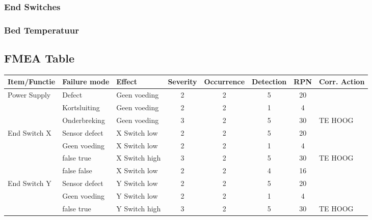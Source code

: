 \documentclass{article}
\begin{document}
\subsubsection*{End Switches}

\subsubsection*{Bed Temperatuur}

\newpage
\begin{landscape}
    \subsection{FMEA Table} 
    \begin{longtable}{|l|l|l|c|c|c|c|l|}
        \hline
        \textbf{Item/Functie} & \textbf{Failure mode} & \textbf{Effect} & \textbf{Severity} & \textbf{Occurrence} & \textbf{Detection} & \textbf{RPN} & \textbf{Corr. Action} \\ \hline
        \multirow{3}{*}{Power Supply}       & Defect            & Geen voeding  & 2 & 2 & 5 & 20 & \\
                                            & Kortsluiting      & Geen voeding  & 2 & 2 & 1 &  4 & \\
                                            & Onderbreking      & Geen voeding  & 3 & 2 & 5 & 30 & TE HOOG \\
                                            \hline
        \multirow{4}{*}{End Switch X}       & Sensor defect     & X Switch low  & 2 & 2 & 5 & 20 & \\
                                            & Geen voeding      & X Switch low  & 2 & 2 & 1 &  4 & \\
                                            & false true        & X Switch high & 3 & 2 & 5 & 30 & TE HOOG \\
                                            & false false       & X Switch low  & 2 & 2 & 4 & 16 & \\ 
                                            \hline
        \multirow{4}{*}{End Switch Y}       & Sensor defect     & Y Switch low  & 2 & 2 & 5 & 20 & \\
                                            & Geen voeding      & Y Switch low  & 2 & 2 & 1 &  4 & \\
                                            & false true        & Y Switch high & 3 & 2 & 5 & 30 & TE HOOG \\

\end{longtable}
\end{landscape}
\end{document}
